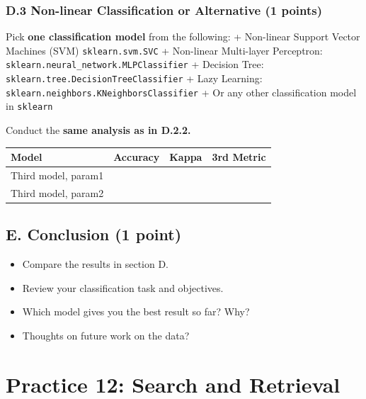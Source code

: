 \documentclass[
  letterpaper,
]{scrbook}
\newcounter{none} %
\providecommand{\tightlist}{%
  \setlength{\itemsep}{0pt}\setlength{\parskip}{0pt}}
\begin{document}
\subsection*{D.3 Non-linear Classification or Alternative (1
points)}\label{d.3-non-linear-classification-or-alternative-1-points}

Pick \textbf{one classification model} from the following: + Non-linear
Support Vector Machines (SVM) \texttt{sklearn.svm.SVC} + Non-linear
Multi-layer Perceptron: \texttt{sklearn.neural\_network.MLPClassifier} +
Decision Tree: \texttt{sklearn.tree.DecisionTreeClassifier} + Lazy
Learning: \texttt{sklearn.neighbors.KNeighborsClassifier} + Or any other
classification model in \texttt{sklearn}

Conduct the \textbf{same analysis as in D.2.2.}

{\def\LTcaptype{none} %
\begin{longtable}[]{@{}llll@{}}
\toprule\noalign{}
Model & Accuracy & Kappa & 3rd Metric \\
\midrule\noalign{}
\endhead
\bottomrule\noalign{}
\endlastfoot
Third model, param1 & & & \\
Third model, param2 & & & \\
\end{longtable}
}

\section*{E. Conclusion (1 point)}\label{e.-conclusion-1-point}


\begin{itemize}
\tightlist
\item[$\square$]
  Compare the results in section D.
\item[$\square$]
  Review your classification task and objectives.
\item[$\square$]
  Which model gives you the best result so far? Why?
\item[$\square$]
  Thoughts on future work on the data?
\end{itemize}

\chapter*{Practice 12: Search and Retrieval}\label{ch-practice-12}
\end{document}
